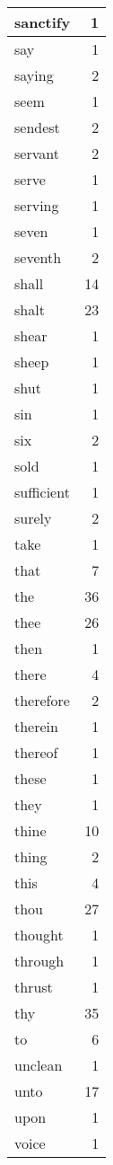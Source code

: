 \begin{center}
\begin{longtable}{l|r}
sanctify & 1 \\ \hline
say & 1 \\ \hline
saying & 2 \\ \hline
seem & 1 \\ \hline
sendest & 2 \\ \hline
servant & 2 \\ \hline
serve & 1 \\ \hline
serving & 1 \\ \hline
seven & 1 \\ \hline
seventh & 2 \\ \hline
shall & 14 \\ \hline
shalt & 23 \\ \hline
shear & 1 \\ \hline
sheep & 1 \\ \hline
shut & 1 \\ \hline
sin & 1 \\ \hline
six & 2 \\ \hline
sold & 1 \\ \hline
sufficient & 1 \\ \hline
surely & 2 \\ \hline
take & 1 \\ \hline
that & 7 \\ \hline
the & 36 \\ \hline
thee & 26 \\ \hline
then & 1 \\ \hline
there & 4 \\ \hline
therefore & 2 \\ \hline
therein & 1 \\ \hline
thereof & 1 \\ \hline
these & 1 \\ \hline
they & 1 \\ \hline
thine & 10 \\ \hline
thing & 2 \\ \hline
this & 4 \\ \hline
thou & 27 \\ \hline
thought & 1 \\ \hline
through & 1 \\ \hline
thrust & 1 \\ \hline
thy & 35 \\ \hline
to & 6 \\ \hline
unclean & 1 \\ \hline
unto & 17 \\ \hline
upon & 1 \\ \hline
voice & 1 \\ \hline

\end{longtable}
\end{center}
